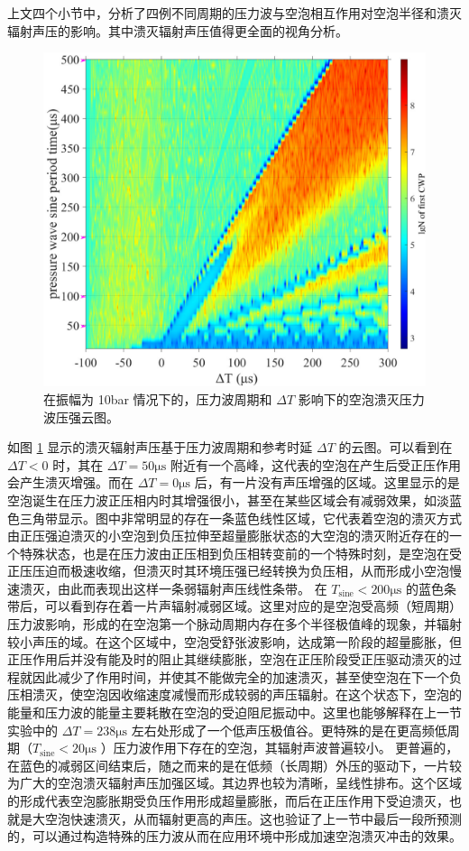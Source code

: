 上文四个小节中，分析了四例不同周期的压力波与空泡相互作用对空泡半径和溃灭辐射声压的影响。其中溃灭辐射声压值得更全面的视角分析。

\begin{figure}[H]
  \centering
  \includegraphics[width=0.9\linewidth]{img/fig5.24-eps-converted-to.pdf}
  \caption{在振幅为 10bar
情况下的，压力波周期和 $\Delta T$ 影响下的空泡溃灭压力波压强云图。}
  \label{fig:5.24}
\end{figure}

如图 \ref{fig:5.24} 显示的溃灭辐射声压基于压力波周期和参考时延 $\Delta T$
的云图。可以看到在 $\Delta T<0$ 时，其在 $\Delta T=50\mathrm{\mu s}$
附近有一个高峰，这代表的空泡在产生后受正压作用会产生溃灭增强。而在
$\Delta T=0\mathrm{\mu s}$
后，有一片没有声压增强的区域。这里显示的是空泡诞生在压力波正压相内时其增强很小，甚至在某些区域会有减弱效果，如淡蓝色三角带显示。图中非常明显的存在一条蓝色线性区域，它代表着空泡的溃灭方式由正压强迫溃灭的小空泡到负压拉伸至超量膨胀状态的大空泡的溃灭附近存在的一个特殊状态，也是在压力波由正压相到负压相转变前的一个特殊时刻，是空泡在受正压压迫而极速收缩，但溃灭时其环境压强已经转换为负压相，从而形成小空泡慢速溃灭，由此而表现出这样一条弱辐射声压线性条带。
在 $T_\mathrm{sine}<200\mathrm{\mu s}$
的蓝色条带后，可以看到存在着一片声辐射减弱区域。这里对应的是空泡受高频（短周期）压力波影响，形成的在空泡第一个脉动周期内存在多个半径极值峰的现象，并辐射较小声压的域。在这个区域中，空泡受舒张波影响，达成第一阶段的超量膨胀，但正压作用后并没有能及时的阻止其继续膨胀，空泡在正压阶段受正压驱动溃灭的过程就因此减少了作用时间，并使其不能做完全的加速溃灭，甚至使空泡在下一个负压相溃灭，使空泡因收缩速度减慢而形成较弱的声压辐射。在这个状态下，空泡的能量和压力波的能量主要耗散在空泡的受迫阻尼振动中。这里也能够解释在上一节实验中的
$\Delta T=238\mathrm{\mu s}$
左右处形成了一个低声压极值谷。更特殊的是在更高频低周期（$T_\mathrm{sine}<20\mathrm{\mu s}$
）压力波作用下存在的空泡，其辐射声波普遍较小。
更普遍的，在蓝色的减弱区间结束后，随之而来的是在低频（长周期）外压的驱动下，一片较为广大的空泡溃灭辐射声压加强区域。其边界也较为清晰，呈线性排布。这个区域的形成代表空泡膨胀期受负压作用形成超量膨胀，而后在正压作用下受迫溃灭，也就是大空泡快速溃灭，从而辐射更高的声压。这也验证了上一节中最后一段所预测的，可以通过构造特殊的压力波从而在应用环境中形成加速空泡溃灭冲击的效果。



